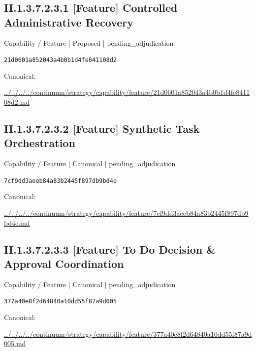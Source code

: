 \documentclass[10pt,a4paper]{article}
\begin{document}
\subsection*{II.1.3.7.2.3.1 [Feature] Controlled Administrative Recovery}
\label{element-21d0601a852043a4b0b1d4fe841108d2}
{\small Capability / Feature | Proposed | pending\_adjudication}\par
\texttt{21d0601a852043a4b0b1d4fe841108d2}\par
Canonical: \par
{\footnotesize\url{../../../../continuum/strategy/capability/feature/21d0601a852043a4b0b1d4fe841108d2.md}}\par
\subsection*{II.1.3.7.2.3.2 [Feature] Synthetic Task Orchestration}
\label{element-7cf9dd3aeeb84a83b2445f897db9bd4e}
{\small Capability / Feature | Canonical | pending\_adjudication}\par
\texttt{7cf9dd3aeeb84a83b2445f897db9bd4e}\par
Canonical: \par
{\footnotesize\url{../../../../continuum/strategy/capability/feature/7cf9dd3aeeb84a83b2445f897db9bd4e.md}}\par
\subsection*{II.1.3.7.2.3.3 [Feature] To Do Decision \& Approval Coordination}
\label{element-377a40e8f2d64840a10dd55f87a9d005}
{\small Capability / Feature | Canonical | pending\_adjudication}\par
\texttt{377a40e8f2d64840a10dd55f87a9d005}\par
Canonical: \par
{\footnotesize\url{../../../../continuum/strategy/capability/feature/377a40e8f2d64840a10dd55f87a9d005.md}}\par
\end{document}
